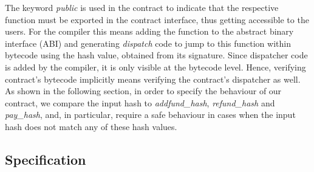 \documentclass[sigplan,10pt]{acmart}\settopmatter{printfolios=true,printccs=false,printacmref=false}
\begin{document}
The keyword \textit{public} is used in the contract to indicate that
the respective function must be exported in the contract interface,
thus getting accessible to the users.
For the compiler this means adding the function to the abstract binary
interface (ABI) and generating \emph{dispatch} code to jump to this function within bytecode using
the hash value, obtained from its signature.
Since dispatcher code is added by the compiler, it is only visible at
the bytecode level. Hence, verifying contract's bytecode implicitly means
verifying the contract's dispatcher as well. 
As shown in the following section, in order to specify the behaviour of our
contract, we compare the input hash to \textit{addfund\_hash}, \textit{refund\_hash} and \textit{pay\_hash},
and, in particular, require a safe behaviour in cases when the input hash does not
match any of these hash values.   
%  
%
%
%
\subsection{Specification}
\label{sec:spec}
\end{document}
